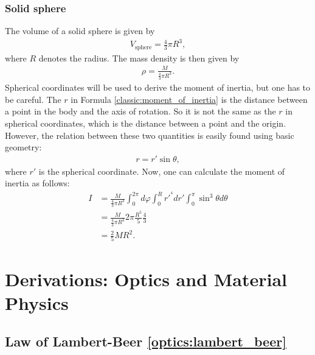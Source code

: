 \subsection{Solid sphere}

    The volume of a solid sphere is given by
    \begin{gather}
        V_\mathrm{sphere} = \frac{4}{3}\pi R^3,
    \end{gather}
    where $R$ denotes the radius. The mass density is then given by
    \begin{gather}
        \rho = \frac{M}{\frac{4}{3}\pi R^3}.
    \end{gather}
    Spherical coordinates will be used to derive the moment of inertia, but one has to be careful. The $r$ in Formula \ref{classic:moment_of_inertia} is the distance between a point in the body and the axis of rotation. So it is not the same as the $r$ in spherical coordinates, which is the distance between a point and the origin. However, the relation between these two quantities is easily found using basic geometry:
    \begin{gather}
        r = r'\sin\theta,
    \end{gather}
    where $r'$ is the spherical coordinate. Now, one can calculate the moment of inertia as follows:
    \begin{align}
        I &= \frac{M}{\frac{4}{3}\pi R^3} \int_0^{2\pi}d\varphi\int_0^Rr'^{^4}dr'\int_0^\pi\sin^3\theta d\theta\nonumber\\
        &= \frac{M}{\frac{4}{3}\pi R^3} 2\pi\frac{R^5}{5}\frac{4}{3}\nonumber\\
        &= \frac{2}{5}MR^2.
    \end{align}

\chapter{Derivations: Optics and Material Physics}

\section{Law of Lambert-Beer \ref{optics:lambert_beer}}

